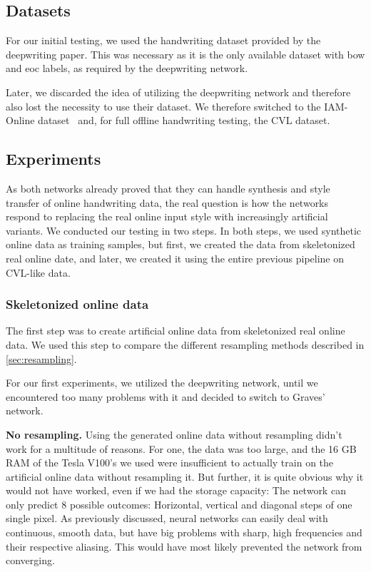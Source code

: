 \subsection{Datasets}
For our initial testing, we used the handwriting dataset provided by the \gls{deepwriting} paper. This was necessary as it is the only available dataset with \gls{bow} and \gls{eoc} labels, as required by the \gls{deepwriting} network.

Later, we discarded the idea of utilizing the \gls{deepwriting} network and therefore also lost the necessity to use their dataset. We therefore switched to the IAM-Online dataset~\cite{iam-online} and, for full offline handwriting testing, the CVL dataset. ~\cite{cvl}

\subsection{Experiments}
As both networks already proved that they can handle synthesis and style transfer of online handwriting data, the real question is how the networks respond to replacing the real online input style with increasingly artificial variants. We conducted our testing in two steps. In both steps, we used synthetic online data as training samples, but first, we created the data from skeletonized real online date, and later, we created it using the entire previous pipeline on CVL-like data.

\subsubsection{Skeletonized online data}
The first step was to create artificial online data from skeletonized real online data. We used this step to compare the different resampling methods described in \cref{sec:resampling}.

For our first experiments, we utilized the \gls{deepwriting} network, until we encountered too many problems with it and decided to switch to Graves' network.

\textbf{No resampling.}
Using the generated online data without resampling didn't work for a multitude of reasons. For one, the data was too large, and the 16 GB RAM of the Tesla V100's we used were insufficient to actually train on the artificial online data without resampling it. But further, it is quite obvious why it would not have worked, even if we had the storage capacity: The network can only predict 8 possible outcomes: Horizontal, vertical and diagonal steps of one single pixel. As previously discussed, neural networks can easily deal with continuous, smooth data, but have big problems with sharp, high frequencies and their respective aliasing. This would have most likely prevented the network from converging.

